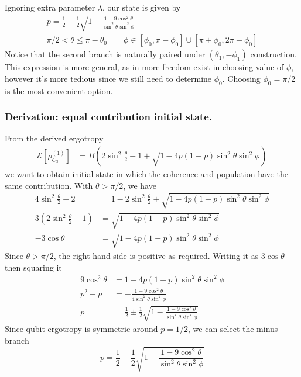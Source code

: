 \documentclass[../../../main.tex]{subfiles}
\begin{document}
Ignoring extra parameter $\lambda$, our state is given by
\begin{gather*}
  p = \frac{1 }{2 }- \frac{1 }{2} \sqrt{1 - \frac{1-9\cos^2\theta}{\sin^2\theta\sin^2\phi}}\\
  \pi/2<\theta\le \pi - \theta_0 \qquad
  \phi \in[\phi_0,\pi-\phi_0] \cup[\pi+\phi_0,2\pi-\phi_0]
\end{gather*}
Notice that the second branch is naturally paired under $(\theta_1,-\phi_1)$ construction.
This expression is more general, as in more freedom exist in choosing value of $\phi$, however it's more tedious since we still need to determine $\phi_0$.
Choosing $\phi_0=\pi/2$ is the most convenient option.

\subsubsection{Derivation: equal contribution initial state.}
From the derived ergotropy
\begin{align*}
  \mathcal{E} \left[ \rho^{(1)}_{C_3} \right]
   & = B \left( 2\sin^2 \frac{\theta }{2} - 1 + \sqrt{1 - 4p(1-p)\sin ^2\theta \sin^2 \phi}  \right)
\end{align*}
we want to obtain initial state in which the coherence and population have the same contribution.
With $\theta > \pi/2$, we have
\begin{align*}
  4 \sin^2 \frac{\theta }{2 }-2             & =   1 - 2 \sin ^2 \frac{\theta }{2} + \sqrt{1-4p(1-p)\sin ^2\theta \sin^2 \phi} \\
  3\left( 2\sin^2\frac{\theta}{2}-1 \right) & = \sqrt{1-4p(1-p)\sin^2\theta\sin^2\phi}                                        \\
  - 3\cos\theta                             & =
  \sqrt{1-4p(1-p)\sin^2\theta\sin^2\phi}
\end{align*}
Since \(\theta>\pi/2\), the right-hand side is positive as required.
Writing it as $3 \cos \theta$ then squaring it
\begin{align*}
  9\cos^2\theta & =
  1-4p(1-p)\sin^2\theta\sin^2\phi                                                                           \\
  p^2-p         & =
  - \frac{1-9\cos^2\theta}{4\sin^2\theta\sin^2\phi}                                                         \\
  p             & = \frac{1 }{2 }\pm \frac{1 }{2} \sqrt{1 - \frac{1-9\cos^2\theta}{\sin^2\theta\sin^2\phi}}
\end{align*}
Since qubit ergotropy is symmetric around $p=1/2$, we can select the minus branch
\begin{equation*}
  p  = \frac{1 }{2 } - \frac{1 }{2} \sqrt{1 - \frac{1-9\cos^2\theta}{\sin^2\theta\sin^2\phi}}
\end{equation*}
\end{document}
